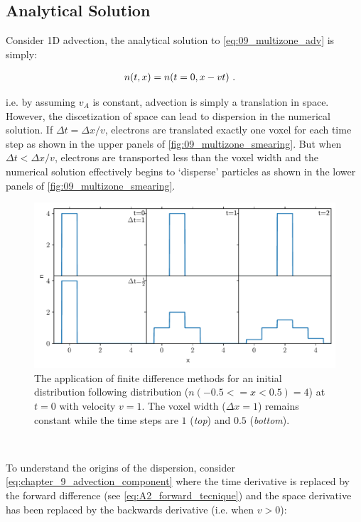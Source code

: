 \subsection{Analytical Solution} \label{sec:09_multizone_adv}

Consider 1D advection, the analytical solution to \autoref{eq:09_multizone_adv} is simply:

\begin{equation}
    \begin{aligned}
        n\qty(t,x)&=n\qty(t=0,x-vt)\text{ .} 
    \end{aligned}
\end{equation}

\noindent i.e. by assuming $v_A$ is constant, advection is simply a translation in space. However, the discetization of space can lead to dispersion in the numerical solution. If $\Delta t = \Delta x/v$, electrons are translated exactly one voxel for each time step as shown in the upper panels of \autoref{fig:09_multizone_smearing}. But when $\Delta t < \Delta x/v$, electrons are transported less than the voxel width and the numerical solution effectively begins to `disperse' particles as shown in the lower panels of \autoref{fig:09_multizone_smearing}.
\begin{figure}[h!]
    \centering
    \includegraphics[width=\textwidth]{09_Multizone/Images/advection/advection_smearing.pdf}
    \caption{The application of finite difference methods for an initial distribution following distribution ($n(-0.5<=x<0.5)=4$) at $t=0$ with velocity $v=1$. The voxel width ($\Delta x=1$) remains constant while the time steps are $1$ (\textit{top}) and $0.5$ (\textit{bottom}).}
    \label{fig:09_multizone_smearing}
\end{figure}
\par~\par 
To understand the origins of the dispersion, consider \autoref{eq:chapter_9_advection_component} where the time derivative is replaced by the forward difference (see \autoref{eq:A2_forward_tecnique}) and the space derivative has been replaced by the backwards derivative (i.e. when $v>0$):

